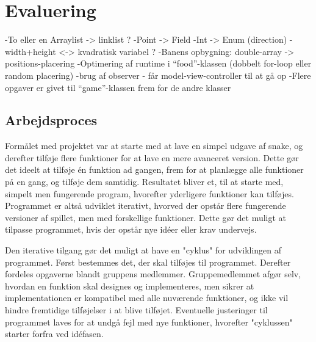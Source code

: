 \section{Evaluering}
-To eller en Arraylist -> linklist ?
-Point -> Field
-Int -> Enum (direction)
-width+height <-> kvadratisk variabel ?
-Banens opbygning: double-array -> positions-placering
-Optimering af runtime i “food”-klassen (dobbelt for-loop eller random placering)
-brug af observer - får model-view-controller til at gå op
-Flere opgaver er givet til “game”-klassen frem for de andre klasser

\subsection{Arbejdsproces}
Formålet med projektet var at starte med at lave en simpel udgave af snake, og derefter tilføje flere funktioner for at lave en mere avanceret version. Dette gør det ideelt at tilføje én funktion ad gangen, frem for at planlægge alle funktioner på en gang, og tilføje dem samtidig. Resultatet bliver et, til at starte med, simpelt men fungerende program, hvorefter yderligere funktioner kan tilføjes. Programmet er altså udviklet iterativt, hvorved der opstår flere fungerende versioner af spillet, men med forskellige funktioner. Dette gør det muligt at tilpasse programmet, hvis der opstår nye idéer eller krav undervejs. 

Den iterative tilgang gør det muligt at have en "cyklus" for udviklingen af programmet. Først bestemmes det, der skal tilføjes til programmet. Derefter fordeles opgaverne blandt gruppens medlemmer. Gruppemedlemmet afgør selv, hvordan en funktion skal designes og implementeres, men sikrer at implementationen er kompatibel med alle nuværende funktioner, og ikke vil hindre fremtidige tilføjelser i at blive tilføjet. Eventuelle justeringer til programmet laves for at undgå fejl med nye funktioner, hvorefter "cyklussen" starter forfra ved idéfasen.
